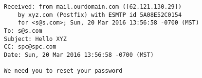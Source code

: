 \begin{lstlisting}
Received: from mail.ourdomain.com ([62.121.130.29])
	by xyz.com (Postfix) with ESMTP id 5A08E52C0154
	for <s@s.com>; Sun, 20 Mar 2016 13:56:58 -0700 (MST)
To: s@s.com
Subject: Hello XYZ
CC: spc@spc.com
Date: Sun, 20 Mar 2016 13:56:58 -0700 (MST)

We need you to reset your password
\end{lstlisting}